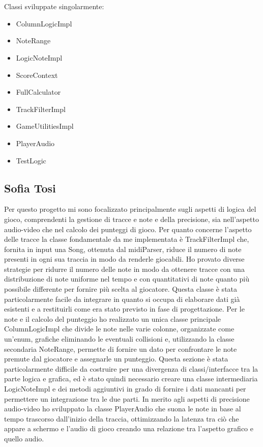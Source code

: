 \documentclass[a4paper,12pt]{report}
\begin{document}
 \\ \\
Classi sviluppate singolarmente:
{
	\begin{itemize}
		\item ColumnLogicImpl
		\item NoteRange
		\item LogicNoteImpl
		\item ScoreContext
		\item FullCalculator
		\item TrackFilterImpl
		\item GameUtilitiesImpl
		\item PlayerAudio
		\item TestLogic
	\end{itemize}


\subsection{Sofia Tosi}
Per questo progetto mi sono focalizzato principalmente sugli aspetti di logica del gioco, comprendenti la gestione di tracce e note e della precisione, sia nell'aspetto audio-video che nel calcolo dei punteggi di gioco. Per quanto concerne l'aspetto delle tracce la classe fondamentale da me implementata è TrackFilterImpl che, fornita in input una Song, ottenuta dal midiParser, riduce il numero di note presenti in ogni sua traccia in modo da renderle giocabili. Ho provato diverse strategie per ridurre il numero delle note in modo da ottenere tracce con una distribuzione di note uniforme nel tempo e con quantitativi di note quanto più possibile differente per fornire più scelta al giocatore. Questa classe è stata particolarmente facile da integrare in quanto si occupa di elaborare dati già esistenti e a restituirli come era stato previsto in fase di progettazione. Per le note e il calcolo del punteggio ho realizzato un unica classe principale ColumnLogicImpl che divide le note nelle varie colonne, organizzate come un'enum, grafiche eliminando le eventuali collisioni e, utilizzando la classe secondaria NoteRange, permette di fornire un dato per confrontare le note premute dal giocatore e assegnarle un punteggio. Questa sezione è stata particolarmente difficile da costruire per una divergenza di classi/interfacce tra la parte logica e grafica, ed è stato quindi necessario creare una classe intermediaria LogicNoteImpl e dei metodi aggiuntivi in grado di fornire i dati mancanti per permettere un integrazione tra le due parti.  
In merito agli aspetti di precisione audio-video ho sviluppato la classe PlayerAudio che suona le note in base al tempo trascorso dall'inizio della traccia, ottimizzando la latenza tra ciò che appare a schermo e l'audio di gioco creando una relazione tra l'aspetto grafico e quello audio.
}
\end{document}
